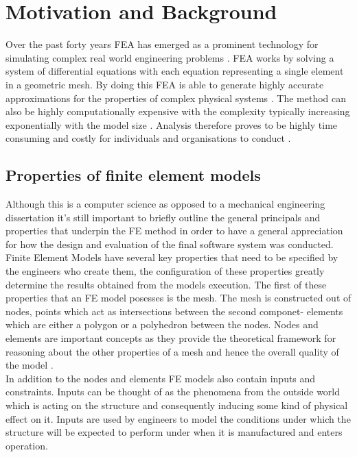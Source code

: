 
\section{Motivation and Background}
Over the past forty years FEA has emerged as a prominent technology for simulating complex real world engineering problems \cite{cite0, DolsakPaper94}. FEA works by solving a system of differential equations with each equation representing a single element in a geometric mesh. By doing this FEA is able to generate highly accurate approximations for the properties of complex physical systems \cite{DolsakPaper94} \cite{IntroductionToFE}. The method can also be highly computationally expensive with the complexity typically increasing exponentially with the model size \cite{DolsakPaper94}. Analysis therefore proves to be highly time consuming and costly for individuals and organisations to conduct \cite{ConsultRuleIntelltSystemFE}. \cite{cite03}\\


\subsection{Properties of finite element models}
Although this is a computer science as opposed to a mechanical engineering dissertation it's still important to briefly outline the general principals and properties that underpin the FE method in order to have a general appreciation for how the design and evaluation of the final software system was conducted. \\ 

\noindent
Finite Element Models have several key properties that need to be specified by the engineers who create them, the configuration of these properties greatly determine the results obtained from the models execution. The first of these properties that an FE model posesses is the mesh. The mesh is constructed out of nodes, points which act as intersections between the second componet- elements which are either a polygon or a polyhedron between the nodes. Nodes and elements are important concepts as they provide the theoretical framework for reasoning about the other properties of a mesh and hence the overall quality of the model \cite{IntroductionToFE}.\\ 

\noindent
In addition to the nodes and elements FE models also contain inputs and constraints. Inputs can be thought of as the phenomena from the outside world which is acting on the structure and consequently inducing some kind of physical effect on it. Inputs are used by engineers to model the conditions under which the structure will be expected to perform under when it is manufactured and enters operation. \\

